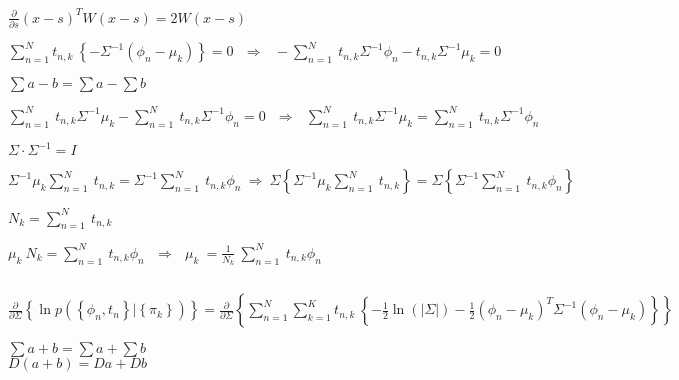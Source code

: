 \documentclass{article}
\begin{document}
\begin{center}
    $ \displaystyle \frac{\partial}{\partial s}\left(x-s\right)^TW\left(x-s\right)=2W\left(x-s\right) $
\end{center}

$ \displaystyle
    \sum_{n=1}^{N}{t_{n,k}\ \left\{-\Sigma^{-1}\left(\phi_n-\mu_k\right)\right\}}=0\ \ \ \Longrightarrow\ \ \ -\sum_{n=1}^{N}{\ t_{n,k}\Sigma^{-1}\phi_n-t_{n,k}\Sigma^{-1}\mu_k}=0
$

\begin{center}
    $\displaystyle  \sum{a-b}=\sum a-\sum b $
\end{center}

$ \displaystyle
    \sum_{n=1}^{N}{\ t_{n,k}\Sigma^{-1}\mu_k}-\sum_{n=1}^{N}{\ t_{n,k}\Sigma^{-1}\phi_n}=0\ \ \ \Longrightarrow\ \ \ \sum_{n=1}^{N}{\ t_{n,k}\Sigma^{-1}\mu_k}=\sum_{n=1}^{N}{\ t_{n,k}\Sigma^{-1}\phi_n}
$

\begin{center}
    $ \displaystyle \Sigma \cdot \Sigma^{-1}=I $
\end{center}

$ \displaystyle
    \Sigma^{-1}\mu_k\sum_{n=1}^{N}{\ t_{n,k}}=\Sigma^{-1}\sum_{n=1}^{N}{\ t_{n,k}\phi_n}\ \Longrightarrow\ \Sigma\left\{\Sigma^{-1}\mu_k\sum_{n=1}^{N}{\ t_{n,k}}\right\}=\Sigma\left\{\Sigma^{-1}\sum_{n=1}^{N}{\ t_{n,k}\phi_n}\right\}\ \ 
$

\begin{center}
    $ \displaystyle N_k=\sum_{n=1}^{N}{\ t_{n,k}} $
\end{center}

$ \displaystyle
    \mu_k\ N_k=\sum_{n=1}^{N}{\ t_{n,k}\phi_n}\ \ \ \Longrightarrow\ \ \ \mu_k\ =\frac{1}{N_k}\ \sum_{n=1}^{N}{\ t_{n,k}\phi_n}\ 
$

\begin{center}
    $  $
\end{center}

$ \displaystyle
    \frac{\partial}{\partial\Sigma}\left\{\ln{p\left(\left\{\phi_n,t_n\right\}|\left\{\pi_k\right\}\right)}\right\}=\frac{\partial}{\partial\Sigma}\left\{\sum_{n=1}^{N}\sum_{k=1}^{K}{t_{n,k}\ \left\{-\frac{1}{2}\ln{\left(\left|\Sigma\right|\right)}-\frac{1}{2}\left(\phi_n-\mu_k\right)^T\Sigma^{-1}\left(\phi_n-\mu_k\right)\right\}}\right\}
$

\begin{center}
    $\displaystyle \sum{a+b}=\sum a+\sum b $ \\
    $\displaystyle D\left(a+b\right)=Da+Db $
\end{center}
\end{document}
